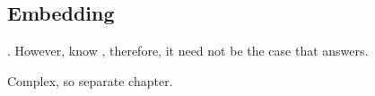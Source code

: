 
\subsection{Embedding}
\label{sec:embedding}

\begin{note}
  \ros{}.
  However, know \fc{}, therefore, it need not be the case that \ros{} answers.

  Complex, so separate chapter.
\end{note}

